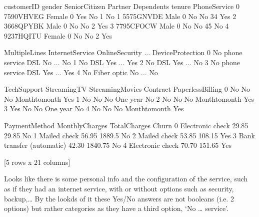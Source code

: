 \documentclass[letterpaper,10pt,english]{jupyterBook}
\begin{document}
\begin{sphinxVerbatim}[commandchars=\\\{\}]
   customerID  gender  SeniorCitizen Partner Dependents  tenure PhoneService  \PYGZbs{}
0  7590\PYGZhy{}VHVEG  Female              0     Yes         No       1           No   
1  5575\PYGZhy{}GNVDE    Male              0      No         No      34          Yes   
2  3668\PYGZhy{}QPYBK    Male              0      No         No       2          Yes   
3  7795\PYGZhy{}CFOCW    Male              0      No         No      45           No   
4  9237\PYGZhy{}HQITU  Female              0      No         No       2          Yes   

      MultipleLines InternetService OnlineSecurity  ... DeviceProtection  \PYGZbs{}
0  No phone service             DSL             No  ...               No   
1                No             DSL            Yes  ...              Yes   
2                No             DSL            Yes  ...               No   
3  No phone service             DSL            Yes  ...              Yes   
4                No     Fiber optic             No  ...               No   

  TechSupport StreamingTV StreamingMovies        Contract PaperlessBilling  \PYGZbs{}
0          No          No              No  Month\PYGZhy{}to\PYGZhy{}month              Yes   
1          No          No              No        One year               No   
2          No          No              No  Month\PYGZhy{}to\PYGZhy{}month              Yes   
3         Yes          No              No        One year               No   
4          No          No              No  Month\PYGZhy{}to\PYGZhy{}month              Yes   

               PaymentMethod MonthlyCharges  TotalCharges Churn  
0           Electronic check          29.85         29.85    No  
1               Mailed check          56.95        1889.5    No  
2               Mailed check          53.85        108.15   Yes  
3  Bank transfer (automatic)          42.30       1840.75    No  
4           Electronic check          70.70        151.65   Yes  

[5 rows x 21 columns]
\end{sphinxVerbatim}

\sphinxAtStartPar
Looks like there is some personal info and the configuration of the service, such as if they had an internet service, with or without options such as security, backup,…
By the lookds of it these Yes/No answers are not booleans (i.e. 2 options) but rather categories as they have a third option, ‘No … service’.
\end{document}
